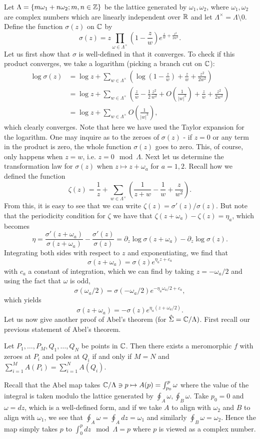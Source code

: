 \documentclass{../mathnotes}
\begin{document}
Let $\Lambda=\left\{ m\omega_1+n\omega_2;m,n\in\mathbb{Z} \right\}$ be the lattice generated by $\omega_1,\omega_2$, where $\omega_1,\omega_2$ are complex numbers
which are linearly independent over $\mathbb{R}$ and let $\Lambda^\times=\Lambda\setminus 0$. Define the function $\sigma(z)$ on $\mathbb{C}$ by
\[\sigma(z)=z\prod_{\omega\in\Lambda^\times}\left( 1- \frac{z}{w}\right)e^{\frac{z}{w}+\frac{z^2}{2w^2}}.\]
Let us first show that $\sigma$ is well-defined in that it converges. To check if this product converges, we take a logarithm (picking a branch cut on $\mathbb{C}$):
\begin{align*}
    \log\sigma(z)&=\log z+\sum_{w\in\Lambda^\times}\left( \log\left(1-\frac{z}{w}\right)+\frac{z}{w}+\frac{z^2}{2w^2} \right)\\
    &=\log z+\sum_{w\in\Lambda^\times}\left( \frac{z}{w}-\frac{1}{2}\frac{z^2}{w^2}+O(\frac{1}{|w|^3})+\frac{z}{w}+\frac{z^2}{2w^2} \right)\\
    &=\log z+\sum_{w\in\Lambda^\times}O(\frac{1}{|w|^3}),
\end{align*}
which clearly converges. Note that here we have used the Taylor expansion for the logarithm. One may inquire as to the zeroes of $\sigma(z)$ - if $z=0$ or
any term in the product is zero, the whole function $\sigma(z)$ goes to zero. This, of course, only happens when $z=w$, i.e. $z=0\mod\Lambda$.
Next let us determine the transformation law for $\sigma(z)$ when $z\mapsto z+\omega_a$ for $a=1,2$. Recall how we defined the function
\[\zeta(z)=\frac{1}{z}+\sum_{w\in\Lambda^\times}\left( \frac{1}{z+w}-\frac{1}{w}+\frac{z}{w^2} \right).\]
From this, it is easy to see that we can write $\zeta(z)=\sigma'(z)/\sigma(z)$. But note that the periodicity condition for $\zeta$ we have that
$\zeta(z+\omega_a)-\zeta(z)=\eta_a$, which becomes
\[\eta=\frac{\sigma'(z+\omega_a)}{\sigma(z+\omega_a)}-\frac{\sigma'(z)}{\sigma(z)}=\partial_z\log\sigma(z+\omega_a)-\partial_z\log\sigma(z).\]
Integrating both sides with respect to $z$ and exponentiating, we find that
\[\sigma(z+\omega_a)=\sigma(z)e^{\eta_az+c_a}\]
with $c_a$ a constant of integration, which we can find by taking $z=-\omega_a/2$ and using the fact that $\omega$ is odd,
\[\sigma(\omega_a/2)=\sigma(-\omega_a/2)e^{-\eta_a\omega_a/2+c_a},\]
which yields
\[\sigma(z+\omega_a)=-\sigma(z)e^{\eta_a(z+\omega_a/2)}.\]
Let us now give another proof of Abel's theorem (for $\hat\Sigma=\mathbb{C}/\Lambda)$. First recall our previous statement of
Abel's theorem.

\begin{thm}
    Let $P_1,\ldots,P_M,Q_1,\ldots,Q_N$ be points in $\mathbb{C}$. Then there exists a meromorphic $f$ with zeroes at $P_i$ and poles at $Q_i$
    if and only if $M=N$ and $\sum_{i=1}^MA(P_i)=\sum_{i=1}^NA(Q_i)$.
\end{thm}
Recall that the Abel map takes $\mathbb{C}/\Lambda\ni p\mapsto A(p)=\int_{p_0}^p\omega$ where the value of the integral is taken modulo the lattice
generated by $\oint_A\omega,\oint_B\omega$. Take $p_0=0$ and $\omega=dz$, which is a well-defined form, and if we take $A$ to align with $\omega_2$
and $B$ to align with $\omega_1$, we see that $\oint_A\omega=\oint_A dz=\omega_1$ and similarly $\oint_B\omega=\omega_2$. Hence the map simply
takes $p$ to $\int_0^p dz \mod\Lambda=p$ where $p$ is viewed as a complex number.
\end{document}
